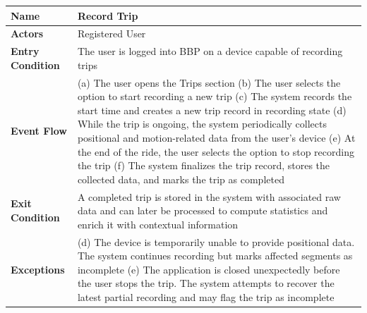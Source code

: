 \begin{table}[H]
\centering
\begin{tabular}{|p{4cm}|p{10cm}|}
\hline
\textbf{Name} & Record Trip \\ \hline
\textbf{Actors} & Registered User \\ \hline
\textbf{Entry Condition} & The user is logged into BBP on a device capable of recording trips \\ \hline
\textbf{Event Flow} &
(a) The user opens the Trips section \newline
(b) The user selects the option to start recording a new trip \newline
(c) The system records the start time and creates a new trip record in recording state \newline
(d) While the trip is ongoing, the system periodically collects positional and motion-related data from the user's device \newline
(e) At the end of the ride, the user selects the option to stop recording the trip \newline
(f) The system finalizes the trip record, stores the collected data, and marks the trip as completed \\ \hline
\textbf{Exit Condition} &
A completed trip is stored in the system with associated raw data and can later be processed to compute statistics and enrich it with contextual information \\ \hline
\textbf{Exceptions} &
(d) The device is temporarily unable to provide positional data. The system continues recording but marks affected segments as incomplete \newline
(e) The application is closed unexpectedly before the user stops the trip. The system attempts to recover the latest partial recording and may flag the trip as incomplete \\ \hline
\end{tabular}
\end{table}

